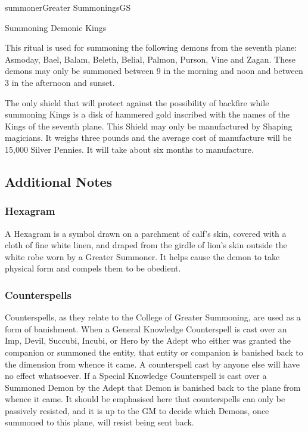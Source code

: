 \begin{college}[1.0]{summoner}{Greater Summonings}{GS}
\begin{ritual}[R-6]{Summoning Demonic Kings}
\begin{effects}
This ritual is used for summoning the following demons from the
seventh plane: Asmoday, Bael, Balam, Beleth, Belial, Palmon, Purson,
Vine and Zagan.  These demons may only be summoned between 9 in the
morning and noon and between 3 in the afternoon and sunset.

The only shield that will protect against the possibility of backfire
while summoning Kings is a disk of hammered gold inscribed with the
names of the Kings of the seventh plane.  This Shield may only be
manufactured by Shaping magicians.  It weighs three pounds and the
average cost of manufacture will be 15,000 Silver Pennies.  It will
take about six months to manufacture.
\end{effects}
\end{ritual}

\subsection{Additional Notes}

\subsubsection{Hexagram}

A Hexagram is a symbol drawn on a parchment of calf's skin, covered
with a cloth of fine white linen, and draped from the girdle of lion's
skin outside the white robe worn by a Greater Summoner.  It helps
cause the demon to take physical form and compels them to be obedient.

\subsubsection{Counterspells}

Counterspells, as they relate to the College of Greater Summoning, are
used as a form of banishment.  When a General Knowledge Counterspell
is cast over an Imp, Devil, Succubi, Incubi, or Hero by the Adept who
either was granted the companion or summoned the entity, that entity
or companion is banished back to the dimension from whence it came.  A
counterspell cast by anyone else will have no effect whatsoever.  If a
Special Knowledge Counterspell is cast over a Summoned Demon by the
Adept that Demon is banished back to the plane from whence it came.
It should be emphasised here that counterspells can only be passively
resisted, and it is up to the GM to decide which Demons, once summoned
to this plane, will resist being sent back.


\end{college}
